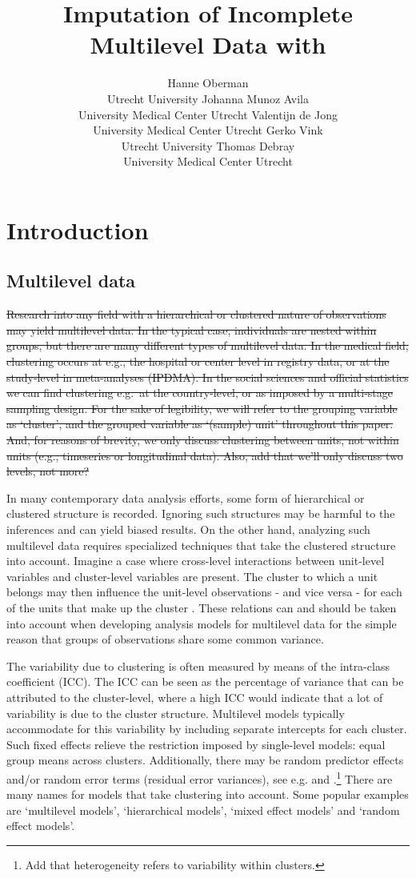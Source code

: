 \documentclass[
]{jss}
\author{
Hanne Oberman\\Utrecht University \And Johanna Munoz Avila\\University
Medical Center Utrecht \AND Valentijn de Jong\\University Medical
Center Utrecht \And Gerko Vink\\Utrecht University \AND Thomas
Debray\\University Medical Center Utrecht
}
\title{Imputation of Incomplete Multilevel Data with \pkg{mice}}
\begin{document}
\hypertarget{introduction}{%
\section{Introduction}\label{introduction}}

\hypertarget{multilevel-data}{%
\subsection{Multilevel data}\label{multilevel-data}}

\sout{Research into any field with a hierarchical or clustered nature of
observations may yield multilevel data. In the typical case, individuals
are nested within groups, but there are many different types of
multilevel data. In the medical field, clustering occurs at e.g., the
hospital or center level in registry data, or at the study-level in
meta-analyses (IPDMA). In the social sciences and official statistics we
can find clustering e.g.~at the country-level, or as imposed by a
multi-stage sampling design. For the sake of legibility, we will refer
to the grouping variable as `cluster', and the grouped variable as
`(sample) unit' throughout this paper. And, for reasons of brevity, we
only discuss clustering between units, not within units (e.g.,
timeseries or longitudinal data). Also, add that we'll only discuss two
levels, not more?}

In many contemporary data analysis efforts, some form of hierarchical or
clustered structure is recorded. Ignoring such structures may be harmful
to the inferences and can yield biased results. On the other hand,
analyzing such multilevel data requires specialized techniques that take
the clustered structure into account. Imagine a case where cross-level
interactions between unit-level variables and cluster-level variables
are present. The cluster to which a unit belongs may then influence the
unit-level observations - and vice versa - for each of the units that
make up the cluster \citep{hox17}. These relations can and should be
taken into account when developing analysis models for multilevel data
for the simple reason that groups of observations share some common
variance.

The variability due to clustering is often measured by means of the
intra-class coefficient (ICC). The ICC can be seen as the percentage of
variance that can be attributed to the cluster-level, where a high ICC
would indicate that a lot of variability is due to the cluster
structure. Multilevel models typically accommodate for this variability
by including separate intercepts for each cluster. Such fixed effects
relieve the restriction imposed by single-level models: equal group
means across clusters. Additionally, there may be random predictor
effects and/or random error terms (residual error variances), see e.g.
\citet{hox17} and \citet{jong21}.\footnote{Add that heterogeneity refers
  to variability within clusters.} There are many names for models that
take clustering into account. Some popular examples are `multilevel
models', `hierarchical models', `mixed effect models' and `random effect
models'.
\end{document}
